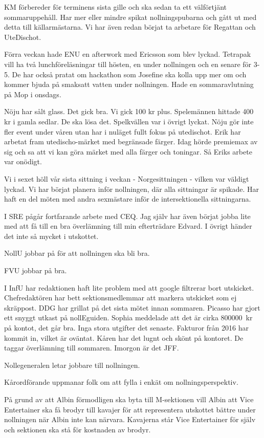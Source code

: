 \documentclass[10pt]{article}
\begin{document}
\begin{paragrafer}
\begin{paragrafer}
KM förbereder för terminens sista gille och ska sedan ta ett välförtjänt sommaruppehåll. Har mer eller mindre spikat nollningspubarna och gått ut med detta till källarmästarna. Vi har även redan börjat ta arbetare för Regattan och UteDischot.

Förra veckan hade ENU en afterwork med Ericsson som blev lyckad. Tetrapak vill ha två lunchföreläsningar till hösten, en under nollningen och en senare för 3-5. De har också pratat om hackathon som Josefine ska kolla upp mer om och kommer bjuda på smaksatt vatten under nollningen. Hade en sommaravlutning på Mop i onsdags.

Nöju har sålt glass. Det gick bra. Vi gick 100 kr plus. Spelemännen hittade 400 kr i gamla sedlar. De ska lösa det. Spelkvällen var i övrigt lyckat. Nöju gör inte fler event under våren utan har i nuläget fullt fokus på utedischot. Erik har arbetat fram utedischo-märket med begränsade färger. Idag hörde premiemax av sig och sa att vi kan göra märket med alla färger och toningar. Så Eriks arbete var onödigt.

Vi i sexet höll vår sista sittning i veckan - Norgesittningen - vilken var väldigt lyckad. Vi har börjat planera inför nollningen, där alla sittningar är spikade. Har haft en del möten med andra sexmästare inför de intersektionella sittningarna.

I SRE pågår fortfarande arbete med CEQ. Jag själv har även börjat jobba lite med att få till en bra överlämning till min efterträdare Edvard. I övrigt händer det inte så mycket i utskottet.

NollU jobbar på för att nollningen ska bli bra.

FVU jobbar på bra.

I InfU har redaktionen haft lite problem med att google filtrerar bort utskicket. Chefredaktören har bett sektionsmedlemmar att markera utskicket som ej skräppost. DDG har grillat på det sista mötet innan sommaren. Picasso har gjort ett snyggt utkast på nollEguiden.
Sophia meddelade att det är cirka \SI{800000}{kr} på kontot, det går bra. Inga stora utgifter det senaste. Fakturor från 2016 har kommit in, vilket är oväntat.
Kåren har det lugnt och skönt på kontoret. De taggar överlämning till sommaren. Imorgon är det JFF.

Nollegeneralen letar jobbare till nollningen.

Kårordförande uppmanar folk om att fylla i enkät om nollningsperspektiv.
\end{paragrafer}
På grund av att Albin förmodligen ska byta till M-sektionen vill Albin att Vice Entertainer ska få brodyr till kavajer för att representera utskottet bättre under nollningen när Albin inte kan närvara. Kavajerna står Vice Entertainer för själv och sektionen ska stå för kostnaden av brodyr.


\end{paragrafer}
\end{document}
